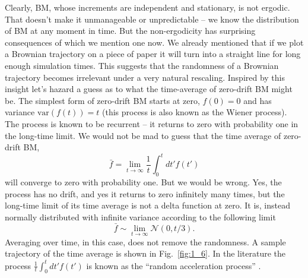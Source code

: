 \documentclass[a4paper]{article}
\newcommand{\var}{\text{var}}
\newcommand{\fref}[1]{Fig.~\ref{fig:#1}}
\newcommand{\be}{\begin{equation}}
\newcommand{\ee}{\end{equation}}
\begin{document}
Clearly, BM, whose increments are independent and stationary, is not ergodic. That doesn't make it
unmanageable or unpredictable -- we know the distribution of BM at any moment in time. But the non-ergodicity
has surprising consequences of which we mention one now. We already mentioned
that if we plot a Brownian trajectory on a piece of paper it will turn into a straight line for long enough
simulation times. This suggests that the randomness of a Brownian trajectory becomes irrelevant
under a very natural rescaling. Inspired by this insight let's hazard a guess as to what 
the time-average of zero-drift BM might be. The simplest form of zero-drift BM starts at zero, $f(0)=0$
and has variance $\var(f(t))=t$ (this process is also known as the Wiener process). The process is 
known to be recurrent -- it returns to zero with probability one in the long-time limit. We would
not be mad to guess that the time average of zero-drift BM,
\be
\bar{f}=\lim_{t\to\infty} \frac{1}{t}\int_0^t dt' f(t')
\ee
will converge to zero with probability one. But we would be wrong. Yes, the process has no drift, and
yes it returns to zero infinitely many times, but the long-time limit of its time average is not a delta function at zero.
It is, instead normally distributed with infinite variance according to the following limit
\be
\bar{f}\sim \lim_{t\to\infty} \mathcal{N}(0,t/3).
\ee
Averaging over time, in this case, does not remove the randomness. A sample 
trajectory of the time average is shown in \fref{1_6}. In the literature the process 
$\frac{1}{t}\int_0^t dt' f(t')$ is known as the ``random acceleration process'' \cite{Burkhardt2007}.
\end{document}
